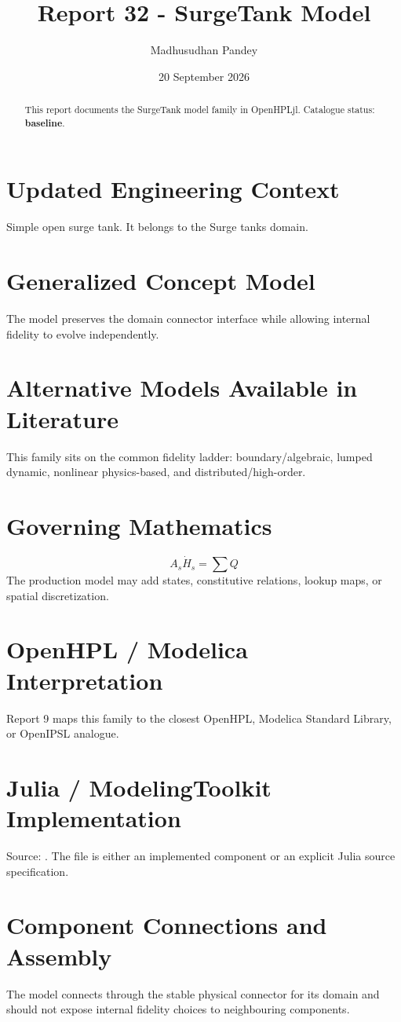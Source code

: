 \documentclass[10pt,a4paper]{article}
\title{Report 32 - SurgeTank Model}
\author{Madhusudhan Pandey}
\date{20 September 2026}
\begin{document}
\maketitle
\begin{abstract}This report documents the SurgeTank model family in OpenHPLjl. Catalogue status: \textbf{baseline}.\end{abstract}
\section{Updated Engineering Context}Simple open surge tank. It belongs to the Surge tanks domain.
\section{Generalized Concept Model}The model preserves the domain connector interface while allowing internal fidelity to evolve independently.
\section{Alternative Models Available in Literature}This family sits on the common fidelity ladder: boundary/algebraic, lumped dynamic, nonlinear physics-based, and distributed/high-order.
\section{Governing Mathematics}\[A_s\dot H_s=\sum Q\]The production model may add states, constitutive relations, lookup maps, or spatial discretization.
\section{OpenHPL / Modelica Interpretation}Report 9 maps this family to the closest OpenHPL, Modelica Standard Library, or OpenIPSL analogue.
\section{Julia / ModelingToolkit Implementation}Source: \texttt{}. The file is either an implemented component or an explicit Julia source specification.
\section{Component Connections and Assembly}The model connects through the stable physical connector for its domain and should not expose internal fidelity choices to neighbouring components.
\end{document}
